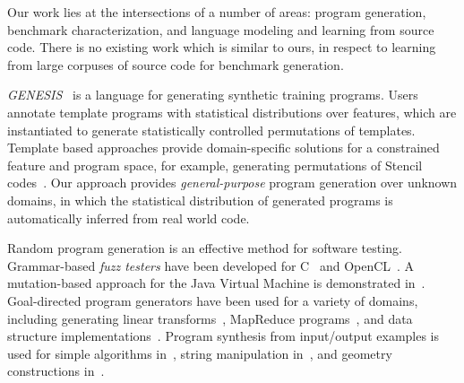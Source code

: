 %
%
%
%
%
%





Our work lies at the intersections of a number of areas: program generation, benchmark characterization, and language modeling and learning from source code. There is no existing work which is similar to ours, in respect to learning from large corpuses of source code for benchmark generation.

\emph{GENESIS}~\cite{Chiu2015} is a language for generating synthetic training programs. Users annotate template programs with statistical distributions over features, which are instantiated to generate statistically controlled permutations of templates. Template based approaches provide domain-specific solutions for a constrained feature and program space, for example, generating permutations of Stencil codes~\cite{Garvey2015b,Cummins2015a}. Our approach provides \emph{general-purpose} program generation over unknown domains, in which the statistical distribution of generated programs is automatically inferred from real world code.

Random program generation is an effective method for software testing. Grammar-based \emph{fuzz testers} have been developed for C~\cite{Yang2012} and OpenCL~\cite{Lidbury2015a}. A mutation-based approach for the Java Virtual Machine is demonstrated in~\cite{Chena}. Goal-directed program generators have been used for a variety of domains, including generating linear transforms~\cite{Voronenko2009}, MapReduce programs~\cite{Smith}, and data structure implementations~\cite{Loncaric2016}. Program synthesis from input/output examples is used for simple algorithms in~\cite{Zaremba2015a}, string manipulation in~\cite{Gulwani2011}, and geometry constructions in~\cite{Gulwani2012}.

